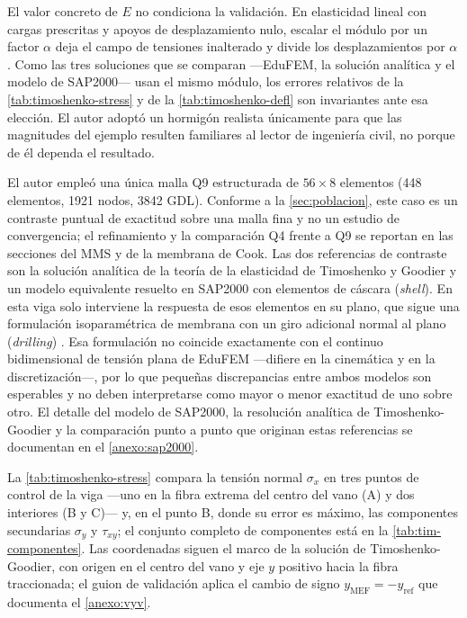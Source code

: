 El valor concreto de $E$ no condiciona la validación. En elasticidad lineal con cargas prescritas y apoyos de desplazamiento nulo, escalar el módulo por un factor $\alpha$ deja el campo de tensiones inalterado y divide los desplazamientos por $\alpha$. Como las tres soluciones que se comparan ---EduFEM, la solución analítica y el modelo de SAP2000--- usan el mismo módulo, los errores relativos de la \autoref{tab:timoshenko-stress} y de la \autoref{tab:timoshenko-defl} son invariantes ante esa elección. El autor adoptó un hormigón realista únicamente para que las magnitudes del ejemplo resulten familiares al lector de ingeniería civil, no porque de él dependa el resultado.

El autor empleó una única malla Q9 estructurada de $56\times8$ elementos (448 elementos, 1921 nodos, 3842 GDL). Conforme a la \autoref{sec:poblacion}, este caso es un contraste puntual de exactitud sobre una malla fina y no un estudio de convergencia; el refinamiento y la comparación Q4 frente a Q9 se reportan en las secciones del MMS y de la membrana de Cook. Las dos referencias de contraste son la solución analítica de la teoría de la elasticidad de Timoshenko y Goodier \autocite[art.~21, pp.~39-43]{timoshenko1970elasticity} y un modelo equivalente resuelto en SAP2000 con elementos de cáscara (\emph{shell}). En esta viga solo interviene la respuesta de esos elementos en su plano, que sigue una formulación isoparamétrica de membrana con un giro adicional normal al plano (\emph{drilling}) \autocite[p.~179]{csi2017sap2000}. Esa formulación no coincide exactamente con el continuo bidimensional de tensión plana de EduFEM —difiere en la cinemática y en la discretización—, por lo que pequeñas discrepancias entre ambos modelos son esperables y no deben interpretarse como mayor o menor exactitud de uno sobre otro. El detalle del modelo de SAP2000, la resolución analítica de Timoshenko-Goodier y la comparación punto a punto que originan estas referencias se documentan en el \autoref{anexo:sap2000}.

La \autoref{tab:timoshenko-stress} compara la tensión normal $\sigma_x$ en tres puntos de control de la viga —uno en la fibra extrema del centro del vano (A) y dos interiores (B y C)— y, en el punto B, donde su error es máximo, las componentes secundarias $\sigma_y$ y $\tau_{xy}$; el conjunto completo de componentes está en la \autoref{tab:tim-componentes}. Las coordenadas siguen el marco de la solución de Timoshenko-Goodier, con origen en el centro del vano y eje $y$ positivo hacia la fibra traccionada; el guion de validación aplica el cambio de signo $y_{\text{MEF}} = -y_{\text{ref}}$ que documenta el \autoref{anexo:vyv}.

